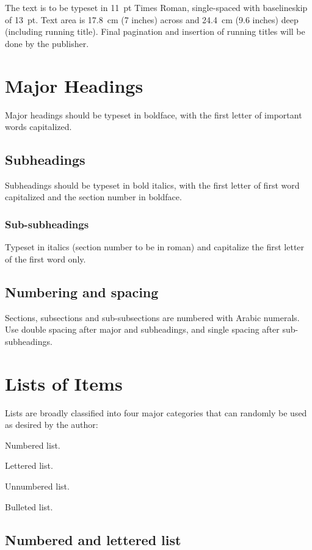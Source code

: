 \documentclass{ws-jai}
\begin{document}
The text is to be typeset in 11~pt Times Roman,
single-spaced with baselineskip of 13~pt. Text area is 17.8~cm (7
inches) across and 24.4~cm (9.6 inches) deep (including running
title). Final pagination and insertion of running titles will be
done by the publisher.

\section{Major Headings}
Major headings should be typeset in boldface, with the first
letter of important words capitalized.

\subsection{Subheadings}
Subheadings should be typeset in bold italics, with the first
letter of first word capitalized and the section number in
boldface.

\subsubsection{Sub-subheadings}
Typeset in italics (section number to be in roman) and capitalize
the first letter of the first word only.

\subsection{Numbering and spacing}
Sections, subsections and sub-subsections are numbered with Arabic
numerals. Use double spacing after major and subheadings, and
single spacing after sub-subheadings.

\section{Lists of Items}
Lists are broadly classified into four major categories that can
randomly be used as desired by the author:
\begin{alphlist}[(d)]
\item Numbered list.
\item Lettered list.
\item Unnumbered list.
\item Bulleted list.
\end{alphlist}

\subsection{Numbered and lettered list}
\end{document}
